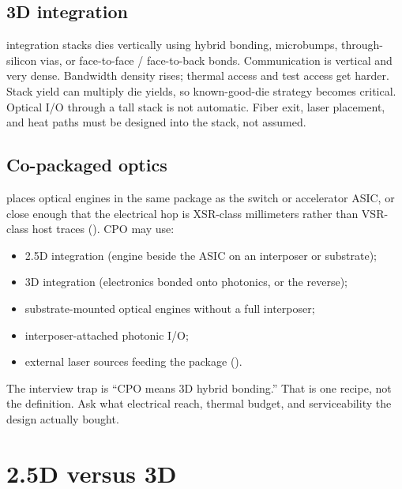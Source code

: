 \subsection{3D integration}
\label{sec:pkg-3d}

 integration stacks dies vertically using hybrid
bonding, microbumps, through-silicon vias, or face-to-face / face-to-back
bonds. Communication is vertical and very dense. Bandwidth density rises;
thermal access and test access get harder. Stack yield can multiply die
yields, so known-good-die strategy becomes critical. Optical I/O through a
tall stack is not automatic. Fiber exit, laser placement, and heat paths
must be designed into the stack, not assumed.

\subsection{Co-packaged optics}
\label{sec:pkg-cpo-def}

 places optical engines in the same
package as the switch or accelerator ASIC, or close enough that the
electrical hop is XSR-class millimeters rather than VSR-class host traces
(). CPO may use:

\begin{itemize}
\item 2.5D integration (engine beside the ASIC on an interposer or substrate);
\item 3D integration (electronics bonded onto photonics, or the reverse);
\item substrate-mounted optical engines without a full interposer;
\item interposer-attached photonic I/O;
\item external laser sources feeding the package ().
\end{itemize}

The interview trap is ``CPO means 3D hybrid bonding.'' That is one recipe,
not the definition. Ask what electrical reach, thermal budget, and
serviceability the design actually bought.

\section{2.5D versus 3D}
\label{sec:pkg-25d-vs-3d}

